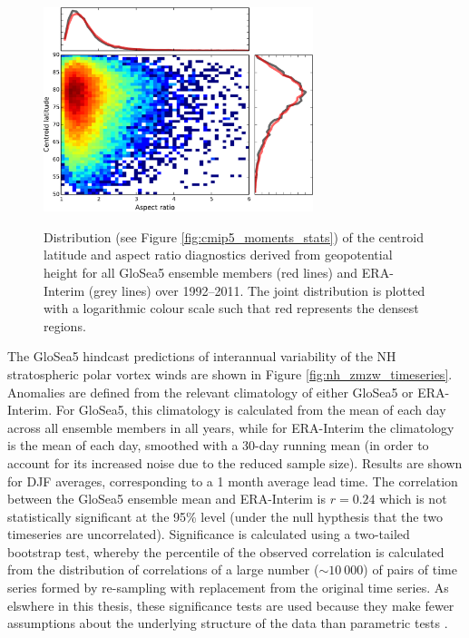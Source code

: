 \begin{figure}[t] \centering
  \noindent\includegraphics[width=0.7\textwidth,angle=0]{figures/chapter-seasonal/GloSea_moments_histogram.pdf}\\
  \caption[Moment diagnostics for GloSea5.]{Distribution (see Figure
    \ref{fig:cmip5_moments_stats}) of the centroid latitude and aspect ratio
    diagnostics derived from geopotential height for all GloSea5 ensemble
    members (red lines) and ERA-Interim (grey lines) over 1992--2011. The joint
    distribution is plotted with a logarithmic colour scale such that red
    represents the densest regions.}\label{fig:nh_moments_glosea}
\end{figure}

The GloSea5 hindcast predictions of interannual variability of the NH
stratospheric polar vortex winds are shown in Figure
\ref{fig:nh_zmzw_timeseries}. Anomalies are defined from the relevant
climatology of either GloSea5 or ERA-Interim. For GloSea5, this climatology is
calculated from the mean of each day across all ensemble members in all years,
while for ERA-Interim the climatology is the mean of each day, smoothed with a
30-day running mean (in order to account for its increased noise due to the
reduced sample size). Results are shown for DJF averages, corresponding to a 1
month average lead time. The correlation between the GloSea5 ensemble mean and
ERA-Interim is $r=0.24$ which is not statistically significant at the 95\% level
(under the null hypthesis that the two timeseries are
uncorrelated). Significance is calculated using a two-tailed bootstrap test,
whereby the percentile of the observed correlation is calculated from the
distribution of correlations of a large number ($\sim 10~000$) of pairs of time
series formed by re-sampling with replacement from the original time series. As
elswhere in this thesis, these significance tests are used because they make
fewer assumptions about the underlying structure of the data than parametric
tests \citep{Wilks}.

